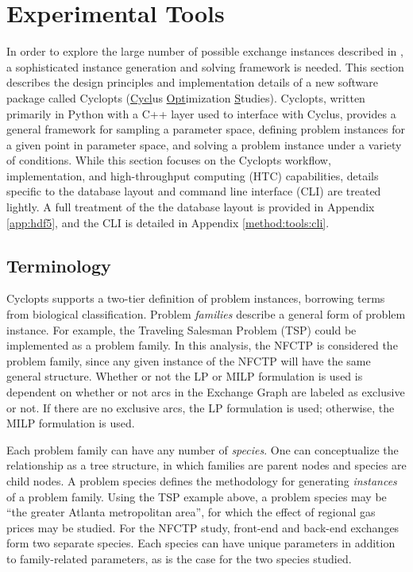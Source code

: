 
\section{Experimental Tools}\label{method:tools}

In order to explore the large number of possible exchange instances described in
, a sophisticated instance generation and solving framework
is needed. This section describes the design principles and implementation
details of a new software package called Cyclopts (\underline{Cycl}us
\underline{Opt}imization \underline{S}tudies). Cyclopts, written primarily in
Python with a C++ layer used to interface with Cyclus, provides a general
framework for sampling a parameter space, defining problem instances for a given
point in parameter space, and solving a problem instance under a variety of
conditions. While this section focuses on the Cyclopts workflow, implementation,
and high-throughput computing (HTC) capabilities, details specific to the
database layout and command line interface (CLI) are treated lightly. A full
treatment of the the database layout is provided in Appendix \ref{app:hdf5}, and
the CLI is detailed in Appendix \ref{method:tools:cli}.

\subsection{Terminology}\label{method:tools:term}

Cyclopts supports a two-tier definition of problem instances, borrowing terms
from biological classification. Problem \textit{families} describe a general
form of problem instance. For example, the Traveling Salesman Problem (TSP)
could be implemented as a problem family. In this analysis, the NFCTP is
considered the problem family, since any given instance of the NFCTP will have
the same general structure. Whether or not the LP or MILP formulation is used is
dependent on whether or not arcs in the Exchange Graph are labeled as exclusive
or not. If there are no exclusive arcs, the LP formulation is used; otherwise,
the MILP formulation is used.

Each problem family can have any number of \textit{species}. One can
conceptualize the relationship as a tree structure, in which families are parent
nodes and species are child nodes. A problem species defines the methodology for
generating \textit{instances} of a problem family. Using the TSP example above,
a problem species may be ``the greater Atlanta metropolitan area'', for which
the effect of regional gas prices may be studied. For the NFCTP study, front-end
and back-end exchanges form two separate species. Each species can have unique
parameters in addition to family-related parameters, as is the case for the two
species studied.

